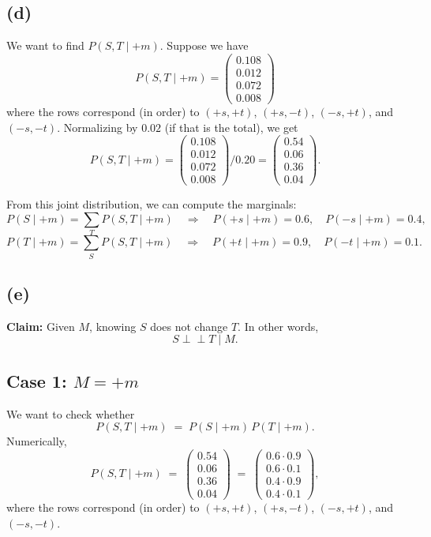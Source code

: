 \documentclass[11pt]{article}
\begin{document}
\subsection*{(d)}
We want to find \(P(S, T \mid +m)\). Suppose we have
\[
P(S,T \mid +m) 
= 
\begin{pmatrix}
0.108\\
0.012\\
0.072\\
0.008
\end{pmatrix}
\]
where the rows correspond (in order) to \((+s,+t)\), \((+s,-t)\), \(( -s,+t)\), and \(( -s,-t)\).  Normalizing by \(0.02\) (if that is the total), we get
\[
P(S,T \mid +m) 
= 
\begin{pmatrix}
0.108 \\[6pt]
0.012 \\[6pt]
0.072 \\[6pt]
0.008
\end{pmatrix}
\Big/ 0.20 
=
\begin{pmatrix}
0.54\\
0.06\\
0.36\\
0.04
\end{pmatrix}.
\]

From this joint distribution, we can compute the marginals:
\[
P(S \mid +m) 
= 
\sum_{T} P(S,T \mid +m) 
\quad\Longrightarrow\quad 
P(+s\mid +m) = 0.6, 
\quad 
P(-s\mid +m) = 0.4,
\]
\[
P(T \mid +m) 
= 
\sum_{S} P(S,T \mid +m) 
\quad\Longrightarrow\quad 
P(+t\mid +m) = 0.9,
\quad 
P(-t\mid +m) = 0.1.
\]

\subsection*{(e)}
\noindent
\textbf{Claim:} Given \(M\), knowing \(S\) does not change \(T\).  
In other words,
\[
  S \perp\!\!\!\perp T \;\big|\; M.
\]

\subsection*{Case 1: \(M = +m\)}

We want to check whether 
\[
  P(S,T \mid +m)
  \;=\;
  P(S \mid +m)\,P(T \mid +m).
\]
Numerically,
\[
  P(S,T \mid +m) 
  \;=\;
  \begin{pmatrix}
    0.54\\[6pt]
    0.06\\[6pt]
    0.36\\[6pt]
    0.04
  \end{pmatrix}
  \;=\;
  \begin{pmatrix}
    0.6 \cdot 0.9\\[4pt]
    0.6 \cdot 0.1\\[4pt]
    0.4 \cdot 0.9\\[4pt]
    0.4 \cdot 0.1
  \end{pmatrix},
\]
where the rows correspond (in order) to \((+s,+t)\), \((+s,-t)\), \(( -s,+t)\), and \(( -s,-t)\).  
\end{document}
